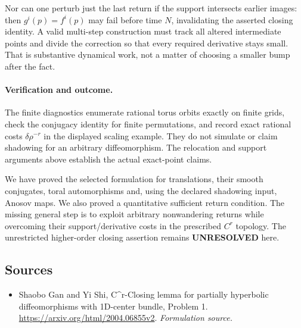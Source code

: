 \documentclass[11pt]{article}
\begin{document}
Nor can one perturb just the last return if the support intersects
earlier images: then $g^i(p)=f^i(p)$ may fail before time $N$,
invalidating the asserted closing identity. A valid multi-step
construction must track all altered intermediate points and divide
the correction so that every required derivative stays small. That
is substantive dynamical work, not a matter of choosing a smaller
bump after the fact.

\paragraph{Verification and outcome.}
The finite diagnostics enumerate rational torus orbits exactly on
finite grids, check the conjugacy identity for finite permutations,
and record exact rational costs $\delta\rho^{-r}$ in the displayed
scaling example. They do not simulate or claim shadowing for an
arbitrary diffeomorphism. The relocation and support arguments above
establish the actual exact-point claims.

We have proved the selected formulation for translations, their
smooth conjugates, toral automorphisms and, using the declared
shadowing input, Anosov maps. We also proved a quantitative sufficient
return condition. The missing general step is to exploit arbitrary
nonwandering returns while overcoming their support/derivative costs
in the prescribed $C^r$ topology. The unrestricted higher-order
closing assertion remains \textbf{UNRESOLVED} here.
\subsection{Sources}
\begin{itemize}
\item[S1]Shaobo Gan and Yi Shi, C\textasciicircum{}r-Closing lemma for partially hyperbolic diffeomorphisms with 1D-center bundle, Problem 1.
\url{https://arxiv.org/html/2004.06855v2}.
\textit{Formulation source.}
\end{itemize}
\end{document}
